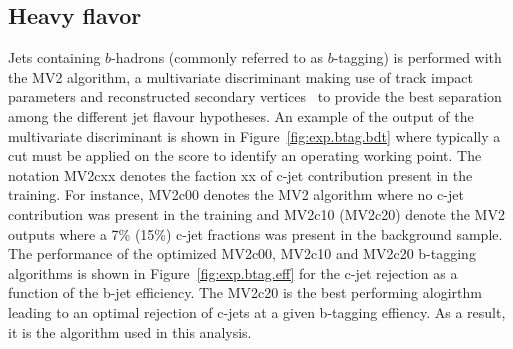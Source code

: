 



\subsection{Heavy flavor}

Jets containing $b$-hadrons (commonly referred to as $b$-tagging) 
is performed with the MV2 algorithm, a multivariate discriminant making 
use of track impact parameters 
and reconstructed secondary vertices~\cite{Aad:2015ydr,ATL-PHYS-PUB-2015-022}
to provide the best separation among the different jet flavour hypotheses.
An example of the output of the multivariate discriminant is shown in Figure~\ref{fig:exp.btag.bdt} 
where typically a cut must be applied on the score to identify an operating working point. 
The notation MV2cxx denotes the faction xx of  c-jet contribution present in the training.
For instance, MV2c00 denotes the MV2 algorithm where no c-jet contribution was present in the training and MV2c10 (MV2c20) denote the MV2 outputs where a 7\% (15\%) c-jet fractions was present 
in the background sample.
The performance of the optimized  MV2c00, MV2c10 and MV2c20 b-tagging algorithms is shown in Figure~\ref{fig:exp.btag.eff}
for the c-jet rejection as a function of the b-jet efficiency.
The MV2c20 is the best performing alogirthm leading to an optimal rejection of c-jets at a given b-tagging 
effiency. As a result, it is the algorithm used in this analysis.


